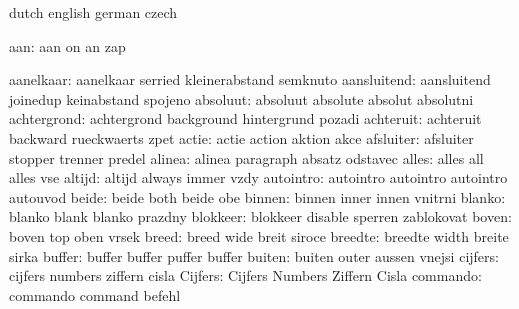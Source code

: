 
\startvariables       dutch                english             german
                      czech

                aan:  aan                  on                  an
                      zap %
 
          aanelkaar:  aanelkaar            serried             kleinerabstand
                      semknuto
        aansluitend:  aansluitend          joinedup            keinabstand
                      spojeno
           absoluut:  absoluut             absolute            absolut
                      absolutni
        achtergrond:  achtergrond          background          hintergrund
                      pozadi
          achteruit:  achteruit            backward            rueckwaerts
                      zpet
              actie:  actie                action              aktion
                      akce
          afsluiter:  afsluiter            stopper             trenner
                      predel
             alinea:  alinea               paragraph           absatz
                      odstavec 
              alles:  alles                all                 alles
                      vse
             altijd:  altijd               always              immer
                      vzdy
          autointro:  autointro            autointro           autointro
                      autouvod
              beide:  beide                both                beide
                      obe
             binnen:  binnen               inner               innen
                      vnitrni
             blanko:  blanko               blank               blanko
                      prazdny
           blokkeer:  blokkeer             disable             sperren
                      zablokovat
              boven:  boven                top                 oben
                      vrsek
              breed:  breed                wide                breit
                      siroce
            breedte:  breedte              width               breite
                      sirka
             buffer:  buffer               buffer              puffer
                      buffer
             buiten:  buiten               outer               aussen
                      vnejsi
            cijfers:  cijfers              numbers             ziffern
                      cisla
            Cijfers:  Cijfers              Numbers             Ziffern
                      Cisla
           commando:  commando             command             befehl
